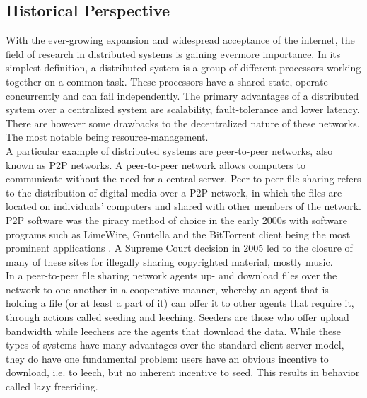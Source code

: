 \documentclass[twocolumn]{article}
\theoremstyle{definition}
\theoremstyle{theorem}
\begin{document}
\subsection{Historical Perspective}
\label{subsec:HistoricalPerspective}
With the ever-growing expansion and widespread acceptance of the internet, the field of research in distributed systems is gaining evermore importance. In its simplest definition, a distributed system is a group of different processors working together on a common task. These processors have a shared state, operate concurrently and can fail independently. The primary advantages of a distributed system over a centralized system are scalability, fault-tolerance and lower latency. There are however some drawbacks to the decentralized nature of these networks. The most notable being resource-management.\vspace{1em}\\

\noindent A particular example of distributed systems are peer-to-peer networks, also known as P2P networks. A peer-to-peer network allows computers to communicate without the need for a central server. Peer-to-peer file sharing refers to the distribution of digital media over a P2P network, in which the files are located on individuals' computers and shared with other members of the network. P2P software was the piracy method of choice in the early 2000s with software programs such as LimeWire, Gnutella and the BitTorrent client being the most prominent applications \cite{The Early Days of Mass Internet Piracy Were Awesome Yet Awful}. A Supreme Court decision in 2005 led to the closure of many of these sites for illegally sharing copyrighted material, mostly music.\vspace{1em}\\

\noindent In a peer-to-peer file sharing network agents up- and download files over the network to one another in a cooperative manner, whereby an agent that is holding a file (or at least a part of it) can offer it to other agents that require it, through actions called seeding and leeching. Seeders are those who offer upload bandwidth while leechers are the agents that download the data. While these types of systems have many advantages over the standard client-server model, they do have one fundamental problem: users have an obvious incentive to download, i.e. to leech, but no inherent incentive to seed. This results in behavior called lazy freeriding. \vspace{1em}\\
\end{document}
